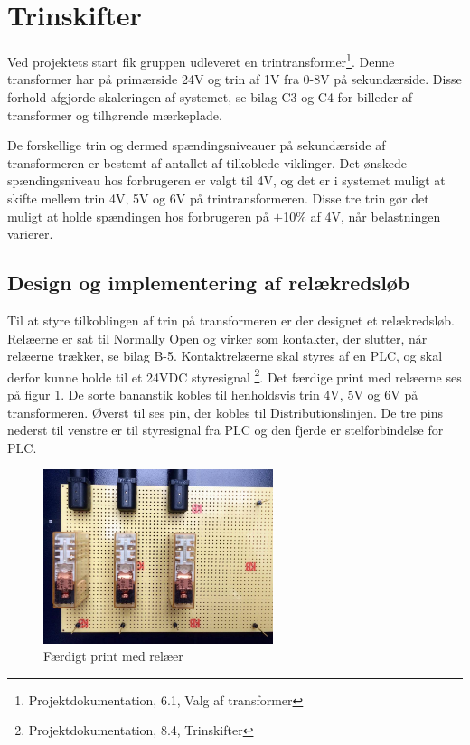 
\section{Trinskifter}
\label{sec:relae}
Ved projektets start fik gruppen udleveret en trintransformer\footnote{Projektdokumentation, 6.1, Valg af transformer}. Denne transformer har på primærside 24V og trin af 1V fra 0-8V på sekundærside. Disse forhold afgjorde skaleringen af systemet, se bilag C3 og C4 for billeder af transformer og tilhørende mærkeplade. 

De forskellige trin og dermed spændingsniveauer på sekundærside af transformeren er bestemt af antallet af tilkoblede viklinger. Det ønskede spændingsniveau hos forbrugeren er valgt til 4V, og det er i systemet muligt at skifte mellem trin 4V, 5V og 6V på trintransformeren. Disse tre trin gør det muligt at holde spændingen hos forbrugeren på $\pm$10$\%$ af 4V, når belastningen varierer.

\subsection{Design og implementering af relækredsløb}
Til at styre tilkoblingen af trin på transformeren er der designet et relækredsløb. Relæerne er sat til Normally Open og virker som kontakter, der slutter, når relæerne trækker, se bilag B-5. Kontaktrelæerne skal styres af en PLC, og skal derfor kunne holde til et 24VDC styresignal \footnote{Projektdokumentation, 8.4, Trinskifter}. Det færdige print med relæerne ses på figur \ref{fig:Relae}. De sorte bananstik kobles til henholdsvis trin 4V, 5V og 6V på transformeren. Øverst til ses pin, der kobles til Distributionslinjen. De tre pins nederst til venstre er til styresignal fra PLC og den fjerde er stelforbindelse for PLC. 

\begin{figure}[H]
	\centering
	\includegraphics[width=0.6\textwidth]{figure/Relaekredsl}
	\caption{Færdigt print med relæer}
	\label{fig:Relae}
\end{figure}

